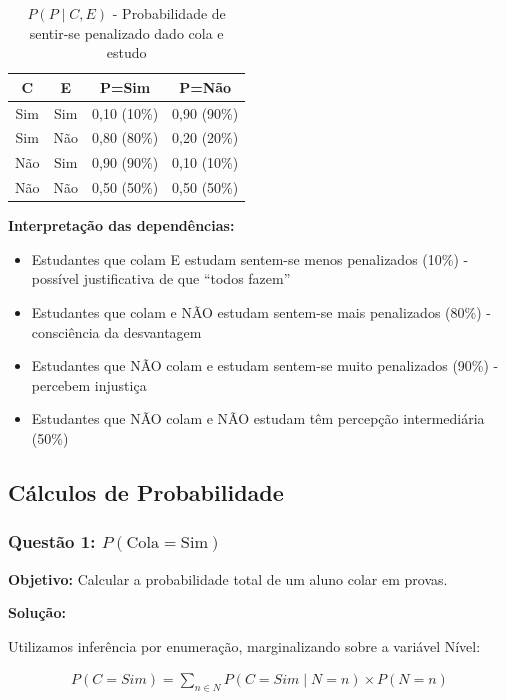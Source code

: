\documentclass[a4paper,12pt]{article}
\begin{document}
\begin{table}[H]
\centering
\begin{tabular}{|c|c|c|c|}
\hline
\textbf{C} & \textbf{E} & \textbf{P=Sim} & \textbf{P=Não} \\
\hline
Sim & Sim & 0,10 (10\%) & 0,90 (90\%) \\
Sim & Não & 0,80 (80\%) & 0,20 (20\%) \\
Não & Sim & 0,90 (90\%) & 0,10 (10\%) \\
Não & Não & 0,50 (50\%) & 0,50 (50\%) \\
\hline
\end{tabular}
\caption{$P(P \mid C, E)$ - Probabilidade de sentir-se penalizado dado cola e estudo}
\end{table}

\textbf{Interpretação das dependências:}
\begin{itemize}
    \item Estudantes que colam E estudam sentem-se menos penalizados (10\%) - possível justificativa de que ``todos fazem''
    \item Estudantes que colam e NÃO estudam sentem-se mais penalizados (80\%) - consciência da desvantagem
    \item Estudantes que NÃO colam e estudam sentem-se muito penalizados (90\%) - percebem injustiça
    \item Estudantes que NÃO colam e NÃO estudam têm percepção intermediária (50\%)
\end{itemize}

\subsection{Cálculos de Probabilidade}

\subsubsection{Questão 1: \texorpdfstring{$P(\text{Cola}=\text{Sim})$}{P(Cola=Sim)}}

\textbf{Objetivo:} Calcular a probabilidade total de um aluno colar em provas.

\textbf{Solução:}

Utilizamos inferência por enumeração, marginalizando sobre a variável Nível:

\begin{align}
P(C=Sim) = \sum_{n \in N} P(C=Sim \mid N=n) \times P(N=n)
\end{align}
\end{document}
